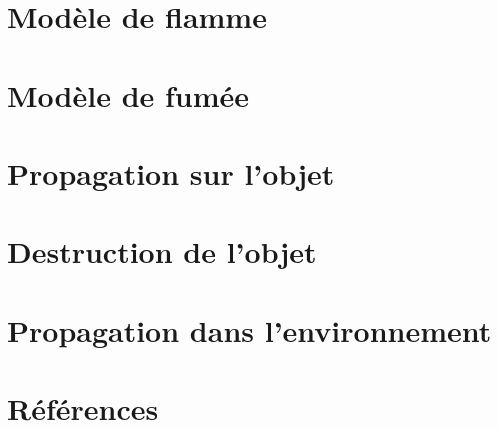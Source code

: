 \documentclass[a4paper,10pt]{article}
\begin{document}
\section{Modèle de flamme}





\section{Modèle de fumée}





\section{Propagation sur l'objet}





\section{Destruction de l'objet}





\section{Propagation dans l'environnement}


\section{Références}


\end{document}
